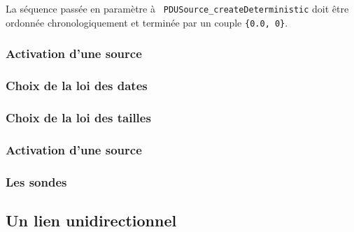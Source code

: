 \documentclass{article}
\begin{document}
   La séquence passée en paramètre à {\tt
     PDUSource\_createDeterministic} doit être ordonnée
   chronologiquement et terminée par un couple {\tt \{0.0, 0\}}.
%
\subsubsection{Activation d'une source}

%
\subsubsection{Choix de la loi des dates}

%
\subsubsection{Choix de la loi des tailles}

%
\subsubsection{Activation d'une source}

%
\subsubsection{Les sondes}


%
\subsection{Un lien unidirectionnel}

%
\end{document}
